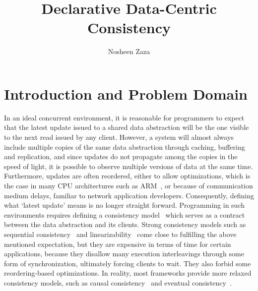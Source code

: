 \documentclass[]{usiinfprospectus}
\author{Nosheen Zaza}
\title{Declarative Data-Centric Consistency }
\begin{document}
\maketitle


\section{Introduction and Problem Domain}




In an ideal concurrent environment, it is reasonable for programmers to expect that the latest update issued to a shared data abstraction will be the one visible to the next read issued by any client. However, a system will almost always include multiple copies of the same data abstraction through caching, buffering and replication, and since updates do not propagate among the copies in the speed of light, it is possible to observe multiple versions of data at the same time. Furthermore, updates are often reordered, either to allow optimizations, which is the case in many CPU architectures such as ARM~\cite{Chong:2008:RAW:1353522.1353528}, or because of communication medium delays, familiar to network application developers. Consequently, defining what `latest update' means is no longer straight forward. Programming in such environments requires defining a consistency model~\cite{adve1996shared} which serves as a contract between the data abstraction and its clients. Strong consistency models such as sequential consistency~\cite{lamport1979make} and linearizability~\cite{herlihy1990linearizability} come close to fulfilling the above mentioned expectation, but they are expensive in terms of time for certain applications, because they disallow many execution interleavings through some form of synchronization, ultimately forcing clients to wait. They also forbid some reordering-based optimizations. In reality, most frameworks provide more relaxed consistency models, such as causal consistency~\cite{raynal1995causal} and eventual consistency~\cite{terry1995managing}. 
\end{document}
